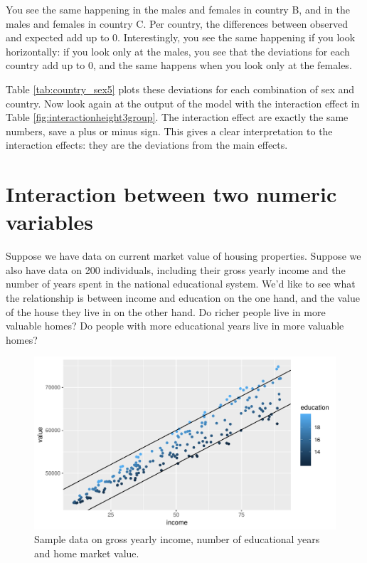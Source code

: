 \documentclass[]{book}\usepackage[]{graphicx}\usepackage[]{color}
\makeatletter
\def\maxwidth{ %
  \ifdim\Gin@nat@width>\linewidth
    \linewidth
  \else
    \Gin@nat@width
  \fi
}
\makeatother
\begin{document}
You see the same happening in the males and females in country B, and in the males and females in country C. Per country, the differences between observed and expected add up to 0. Interestingly, you see the same happening if you look horizontally: if you look only at the males, you see that the deviations for each country add up to 0, and the same happens when you look only at the females. 

Table \ref{tab:country_sex5} plots these deviations for each combination of sex and country. Now look again at the output of the model with the interaction effect in Table \ref{fig:interactionheight3group}. The interaction effect are exactly the same numbers, save a plus or minus sign. This gives a clear interpretation to the interaction effects: they are the deviations from the main effects. 










\section{Interaction between two numeric variables}

Suppose we have data on current market value of housing properties. Suppose we also have data on 200 individuals, including their gross yearly income and the number of years spent in the national educational system. We'd like to see what the relationship is between income and education on the one hand, and the value of the house they live in on the other hand. Do richer people live in more valuable homes? Do people with more educational years live in more valuable homes? 

\begin{figure}

{\centering \includegraphics[width=\maxwidth]{figure/linearbylinear_1-1} 

}

\caption[Sample data on gross yearly income, number of educational years and home market value]{Sample data on gross yearly income, number of educational years and home market value.}\label{fig:linearbylinear_1}
\end{figure}
\end{document}
